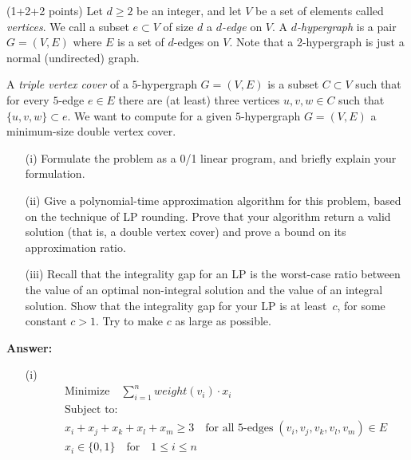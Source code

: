 \documentclass{article}
\renewcommand{\leq}{\leqslant}
\renewcommand{\geq}{\geqslant}
\newcounter{rcounter}
\newenvironment{rlist}%
{\begin{list}{\setnr-\arabic{rcounter}}{\usecounter{rcounter}}}{\end{list}}
\begin{document}
\begin{rlist}
        \item (1+2+2 points)
        Let $d\geq 2$ be an integer, and let $V$ be a set of elements called \emph{vertices}.
        We call a subset $e\subset V$ of size $d$ a \emph{$d$-edge} on $V$.
        A \emph{$d$-hypergraph} is a pair $G=(V,E)$ where $E$ is a set of $d$-edges on $V$.
        Note that a 2-hypergraph is just a normal (undirected) graph.
        
        A \emph{triple vertex cover} of a $5$-hypergraph $G=(V,E)$ is a subset $C\subset V$ such that
        for every $5$-edge $e\in E$ there are (at least) three vertices $u,v,w\in C$ such that $\{u,v,w\}\subset e$.
        We want to compute for a given $5$-hypergraph $G=(V,E)$ a minimum-size
        double vertex cover.
        \begin{enumerate}
            \item[(i)] Formulate the problem as a 0/1 linear program, and briefly explain
            your formulation.
            \item[(ii)] Give a polynomial-time approximation algorithm for this problem, based on the
            technique of LP rounding. Prove that your algorithm return a valid
            solution (that is, a double vertex cover) and prove a bound on its approximation ratio.
            \item[(iii)] Recall that the integrality gap for an LP is the 
            worst-case ratio between the value
            of an optimal non-integral solution and the value of an integral solution.
            Show that the integrality gap for your LP is at least~$c$, for some
            constant $c>1$. Try to make $c$ as large as possible.
        \end{enumerate}
        \textbf{Answer:}
        \begin{enumerate}
            \item[(i)] 
            \begin{eqnarray*}
                && \textrm{Minimize} \quad \sum_{i=1}^{n} weight(v_i) \cdot x_i \\
                &&\textrm{Subject to:}\\
                && x_i+x_j+x_k+x_l+x_m \geq 3 \quad \textrm{for all 5-edges} \; (v_i, v_j, v_k, v_l, v_m) \in  E\\
                && x_i \in \{0, 1\} \quad \textrm{for} \quad 1\leq i \leq n
            \end{eqnarray*}
            

\end{enumerate}
\end{rlist}
\end{document}
